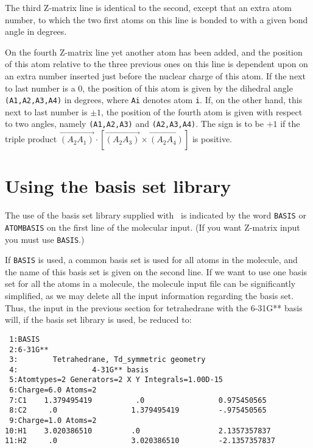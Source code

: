 The third Z-matrix line is identical to the second, except that an extra atom
number, to which the two first atoms on this line is bonded to with a
given bond angle in degrees.

On the fourth Z-matrix line yet another atom has been added, and the position
of this atom relative to the three previous ones on this line is
dependent upon on an extra number inserted just before the nuclear
charge of this atom. If the next to last number is a 0, the
position of this atom is given by the dihedral angle {\tt
(A1,A2,A3,A4)} in degrees, where {\tt Ai} denotes atom {\tt i}. If, on the other
hand, this next to last number is $\pm 1$, the position of the fourth
atom is given with respect to two angles, namely {\tt (A1,A2,A3)} and
{\tt (A2,A3,A4)}. The sign is to be $+ 1$ if the triple product
$\overrightarrow{\left(A_{2}A_{1}\right)}\cdot\left[\overrightarrow{\left(A_{2}A_{3}\right)}\times\overrightarrow{\left(A_{2}A_{4}\right)}\right]$
is positive.

\section{Using the basis set library}\label{sec:molbasis}

The use of the basis set library supplied with \dalton\ is indicated
by the word {\tt BASIS} or {\tt ATOMBASIS} on the first line of the
molecular input.
(If you want Z-matrix input you must use {\tt BASIS}.)

If {\tt BASIS} is used, a common basis set is used for all atoms in
the molecule, and the name of this basis set is given on the second line.
If we want to use one basis set for all the
atoms in a molecule, the molecule input file can be significantly
simplified, as we may delete all the input information regarding the
basis set. Thus, the input in the previous section for tetrahedrane
with the 6-31G** basis will, if the basis set library is used,  be reduced
to:

\begin{verbatim}
 1:BASIS
 2:6-31G**
 3:        Tetrahedrane, Td_symmetric geometry
 4:                 4-31G** basis
 5:Atomtypes=2 Generators=2 X Y Integrals=1.00D-15
 6:Charge=6.0 Atoms=2
 7:C1    1.379495419          .0                 0.975450565
 8:C2     .0                 1.379495419         -.975450565
 9:Charge=1.0 Atoms=2
10:H1    3.020386510         .0                  2.1357357837
11:H2     .0                 3.020386510         -2.1357357837
\end{verbatim}

